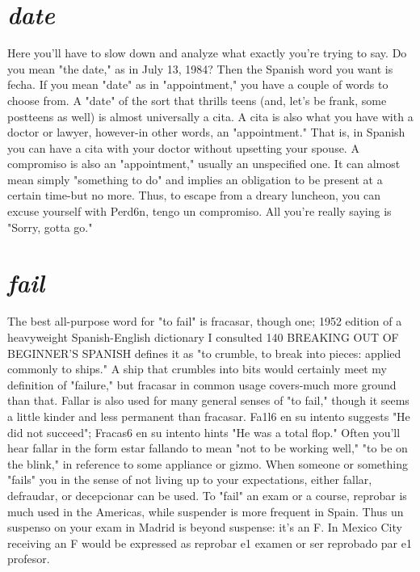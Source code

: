 \documentclass[14pt,a4paper,oneside]{memoir}
\begin{document}
\section{\emph{date}}

Here you'll have to slow down and analyze what exactly you're
trying to say. Do you mean "the date," as in July 13, 1984? Then the
Spanish word you want is fecha. If you mean "date" as in "appointment," you have a couple of words to choose from. A "date" of the sort
that thrills teens (and, let's be frank, some postteens as well) is almost
universally a cita. A cita is also what you have with a doctor or lawyer, however-in other words, an "appointment." That is, in Spanish
you can have a cita with your doctor without upsetting your spouse. A
compromiso is also an "appointment," usually an unspecified one. It
can almost mean simply "something to do" and implies an obligation
to be present at a certain time-but no more. Thus, to escape from a
dreary luncheon, you can excuse yourself with Perd6n, tengo un compromiso. All you're really saying is "Sorry, gotta go."

\section{\emph{fail}}

The best all-purpose word for "to fail" is fracasar, though one;
1952 edition of a heavyweight Spanish-English dictionary I consulted
140 BREAKING OUT OF BEGINNER'S SPANISH
defines it as "to crumble, to break into pieces: applied commonly to
ships." A ship that crumbles into bits would certainly meet my definition of "failure," but fracasar in common usage covers-much more
ground than that. Fallar is also used for many general senses of "to
fail," though it seems a little kinder and less permanent than fracasar.
Fa1l6 en su intento suggests "He did not succeed"; Fracas6 en su intento hints "He was a total flop." Often you'll hear fallar in the form
estar fallando to mean "not to be working well," "to be on the blink,"
in reference to some appliance or gizmo. When someone or something
"fails" you in the sense of not living up to your expectations, either
fallar, defraudar, or decepcionar can be used. To "fail" an exam or a
course, reprobar is much used in the Americas, while suspender is
more frequent in Spain. Thus un suspenso on your exam in Madrid is
beyond suspense: it's an F. In Mexico City receiving an F would be expressed as reprobar e1 examen or ser reprobado par e1 profesor.
\end{document}
